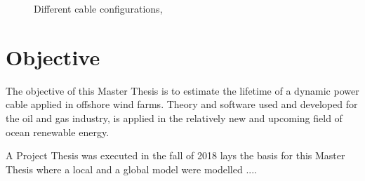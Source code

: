 \begin{figure}[H]
\hfill
{}\hfill
\caption[$\; \:$Cable configurations]{Different cable configurations, \cite{ds2010}}
\label{fig:cableconfig}
\end{figure}

\section{Objective}
The objective of this Master Thesis is to estimate the lifetime of a dynamic power cable applied in offshore wind farms. Theory and software used and developed for the oil and gas industry, is applied in the relatively new and upcoming field of ocean renewable energy.

A Project Thesis was executed in the fall of 2018 lays the basis for this Master Thesis where a local and a global model were modelled                 ....

